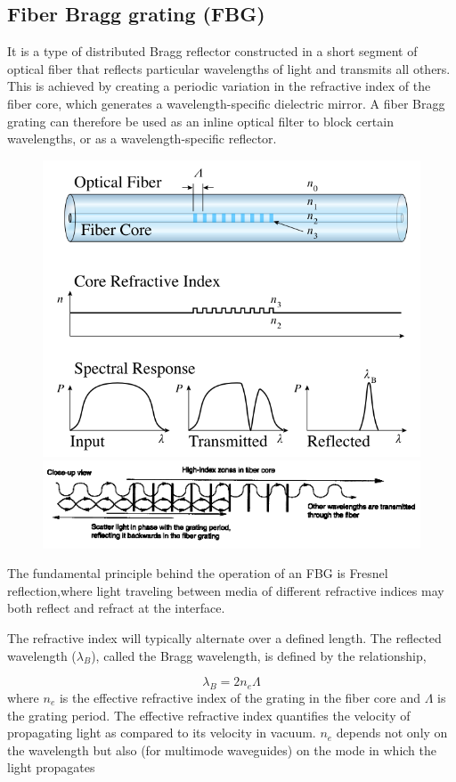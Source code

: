 \documentclass[twocolumn]{article}
\numberwithin{equation}{section}
\begin{document}
	\subsection{Fiber Bragg grating (FBG)}
It is a type of distributed Bragg reflector constructed in a short segment of optical fiber that reflects particular wavelengths of light and transmits all others. This is achieved by creating a periodic variation in the refractive index of the fiber core, which generates a wavelength-specific dielectric mirror. A fiber Bragg grating can therefore be used as an inline optical filter to block certain wavelengths, or as a wavelength-specific reflector.
\begin{figure}[H]
	\centering
	\includegraphics[width=.5\textwidth]{642px-Fiber_Bragg_Grating-en.png}
	\includegraphics[width=.5\textwidth]{1bf87a87405.png}
\end{figure}

The fundamental principle behind the operation of an FBG is Fresnel reflection,where light traveling between media of different refractive indices may both reflect and refract at the interface.

The refractive index will typically alternate over a defined length. The reflected wavelength ($\scriptstyle \lambda_B$), called the Bragg wavelength, is defined by the relationship,

$$\lambda_B = 2 n_e \Lambda$$
where $\scriptstyle n_e$ is the effective refractive index of the grating in the fiber core and $\scriptstyle \Lambda$ is the grating period. The effective refractive index quantifies the velocity of propagating light as compared to its velocity in vacuum. $\scriptstyle n_e$ depends not only on the wavelength but also (for multimode waveguides) on the mode in which the light propagates
\end{document}

